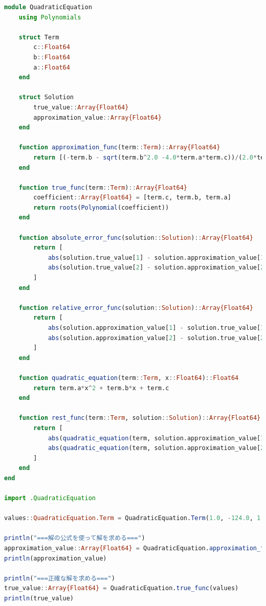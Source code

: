 \documentclass[uplatex, dvipdfmx, a4j,11pt]{jsarticle}
\begin{document}
\begin{lstlisting}[title={(2-1)のソースコード}, label=code:in, language=Julia]
    module QuadraticEquation
    using Polynomials

    struct Term
        c::Float64
        b::Float64
        a::Float64
    end

    struct Solution
        true_value::Array{Float64}
        approximation_value::Array{Float64}
    end

    function approximation_func(term::Term)::Array{Float64}
        return [(-term.b - sqrt(term.b^2.0 -4.0*term.a*term.c))/(2.0*term.a), (-term.b + sqrt(term.b^2.0 -4.0*term.a*term.c))/(2.0*term.a)]
    end

    function true_func(term::Term)::Array{Float64}
        coefficient::Array{Float64} = [term.c, term.b, term.a]
        return roots(Polynomial(coefficient))
    end

    function absolute_error_func(solution::Solution)::Array{Float64}
        return [
            abs(solution.true_value[1] - solution.approximation_value[1]),
            abs(solution.true_value[2] - solution.approximation_value[2])
        ]
    end

    function relative_error_func(solution::Solution)::Array{Float64}
        return [
            abs(solution.approximation_value[1] - solution.true_value[1]) / abs(solution.true_value[1]),
            abs(solution.approximation_value[2] - solution.true_value[2]) / abs(solution.true_value[2]),
        ]
    end

    function quadratic_equation(term::Term, x::Float64)::Float64
        return term.a*x^2 + term.b*x + term.c
    end

    function rest_func(term::Term, solution::Solution)::Array{Float64}
        return [
            abs(quadratic_equation(term, solution.approximation_value[1]) - quadratic_equation(term, solution.true_value[1])),
            abs(quadratic_equation(term, solution.approximation_value[2]) - quadratic_equation(term, solution.true_value[2])),
        ]
    end
end

import .QuadraticEquation

values::QuadraticEquation.Term = QuadraticEquation.Term(1.0, -124.0, 1.0)

println("===解の公式を使って解を求める===")
approximation_value::Array{Float64} = QuadraticEquation.approximation_func(values)
println(approximation_value)

println("===正確な解を求める===")
true_value::Array{Float64} = QuadraticEquation.true_func(values)
println(true_value)


\end{lstlisting}
\end{document}
